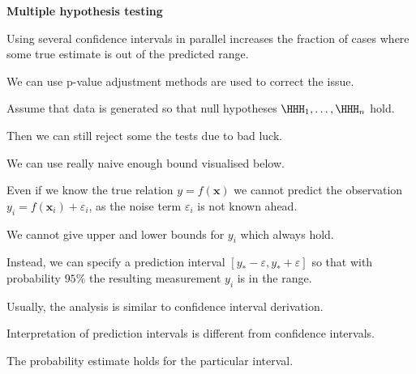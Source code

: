 \documentclass[landscape,footrule]{foils}
\renewcommand{\vec}[1]{\boldsymbol{#1}}
\begin{document}
\textbf{Multiple hypothesis testing}

\begin{triangles}
\item Using several confidence intervals in parallel increases the fraction of cases where some true estimate is out of the predicted range.
\item We can use p-value adjustment methods are used to correct the issue.
\end{triangles}  


Assume that data is generated so that null hypotheses $\HHH_1,\ldots, \HHH_n$ hold.
\begin{triangles}
\item Then we can still reject some the tests due to bad luck.
\item We can use really naive enough bound visualised below. 
\end{triangles}  

\vspace*{3ex}
\vspace*{-2ex}




Even if we know the true relation $y=f(\vec{x})$ we cannot predict the observation $y_{i}=f(\vec{x}_i)+\varepsilon_i$, as the noise term $\varepsilon_{i}$ is not known ahead.
\begin{triangles}
\item We cannot give upper and lower bounds for $y_i$ which always hold.
\end{triangles}
\vspace*{4ex}

Instead, we can specify a prediction interval $[y_*-\varepsilon, y_*+\varepsilon]$ so that with probability $95\%$ the resulting measurement $y_i$ is in the range.
\begin{triangles}
\item Usually, the analysis is similar to confidence interval derivation.
\end{triangles}  
\vspace*{4ex}

Interpretation of prediction intervals is different from confidence intervals.

\begin{triangles}
\item The probability estimate holds for the particular interval.
\end{triangles}  
\end{document}
